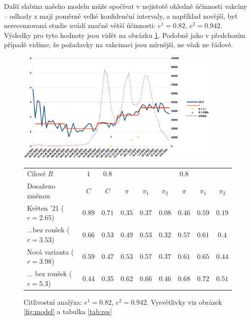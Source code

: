 Další slabina našeho modelu může spočívat v nejistotě ohledně účinnosti vakcíny
-- odhady z \cite{hall2021covid} mají poměrně velké konfidenční
intervaly, a například novější, byť nerecenzovaná studie \cite{shapiro2021efficacy}
uvádí značně větší účinnosti: $e^{1}=0.82$, $e^{2}=0.942.$ Výsledky pro tyto hodnoty jsou vidět na obrázku \ref{fig:cv}. Podobně jako v předchozím případě vidíme, že požadavky na vakcinaci jsou  mírnější, ne však ne řádově.

\begin{figure}
\begin{center}
\includegraphics[width=10cm]{pic/wholee} 

\begin{tabular}{l|c|c|ccc|ccc}									
Cílové $R$	& $1$	& $0.8$	&	&	&	& $0.8$	&	&	\\ 
Dosaženo změnou	& $C$	& $C$	& $\pi$	& $\pi_1$	& $\pi_2$	& $\pi$	& $\pi_1$	& $\pi_2$	\\ \hline
Květen '21 ($r=2.65$)	& $0.89$	& $0.71$	& $0.35$	& $0.37$	& $0.08$	& $0.46$	& $0.59$	& $0.19$	\\
...bez roušek ($r=3.53$)	& $0.66$	& $0.53$	& $0.49$	& $0.53$	& $0.32$	& $0.57$	& $0.61$	& $0.4$	\\
Nová varianta ($r=3.98$)	& $0.59$	& $0.47$	& $0.53$	& $0.57$	& $0.37$	& $0.61$	& $0.65$	& $0.44$	\\
... bez roušek ($r=5.3$)	& $0.44$	& $0.35$	& $0.62$	& $0.66$	& $0.46$	& $0.68$	& $0.72$	& $0.51$
\end{tabular}									

\caption{Citlivostní analýza: $e^{1}=0.82$, $e^{2}=0.942.$ Vysvětlivky viz obrázek \ref{fig:model} a tabulka \ref{tab:res}}
\label{fig:cv}

\end{center}
\end{figure}


